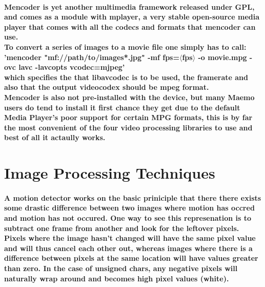\documentclass[11pt]{article} %
\begin{document}
\paragraph{Mencoder is yet another multimedia framework released under GPL, and comes as a module with mplayer, a very stable open-source media player that comes with all the codecs and formats that mencoder can use.\\
To convert a series of images to a movie file one simply has to call:\\
'mencoder "mf://path/to/images*.jpg" -mf fps=\(\langle\)fps\(\rangle\) -o movie.mpg -ovc lavc -lavcopts vcodec=mjpeg'\\
which specifies the that libavcodec is to be used, the framerate and also that the output videocodex should be mpeg format.
\\Mencoder is also not pre-installed with the device, but many Maemo users do tend to install it first chance they get due to the default Media Player's poor support for certain MPG formats, this is by far the most convenient of the four video processing libraries to use and best of all it actaully works.
}
\section{Image Processing Techniques}
\paragraph{A motion detector works on the basic priniciple that there there exists some drastic difference between two images where motion has occred and motion has not occured. One way to see this represenation is to subtract one frame from another and look for the leftover pixels. Pixels where the image hasn't changed will have the same pixel value and will thus cancel each other out, whereas images where there is a difference between pixels at the same location will have values greater than zero. In the case of unsigned chars, any negative pixels will naturally wrap around and becomes high pixel values (white).}
\end{document}

